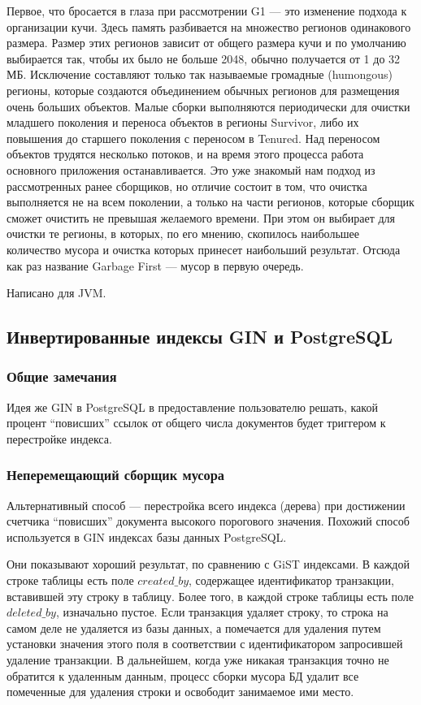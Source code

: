 Первое, что бросается в глаза при рассмотрении G1\cite{G1GC:2018} — это изменение подхода к организации кучи.
Здесь память разбивается на множество регионов одинакового размера. Размер этих регионов зависит
от общего размера кучи и по умолчанию выбирается так, чтобы их было не больше 2048,
обычно получается от 1 до 32 МБ. Исключение составляют только так называемые громадные (humongous)
регионы, которые создаются объединением обычных регионов для размещения очень больших объектов.
Малые сборки выполняются периодически для очистки младшего поколения и переноса объектов
в регионы Survivor, либо их повышения до старшего поколения с переносом в Tenured.
Над переносом объектов трудятся несколько потоков, и на время этого процесса работа основного
приложения останавливается. Это уже знакомый нам подход из рассмотренных ранее сборщиков,
но отличие состоит в том, что очистка выполняется не на всем поколении, а только на части регионов,
которые сборщик сможет очистить не превышая желаемого времени. При этом он выбирает для очистки те регионы,
в которых, по его мнению, скопилось наибольшее количество мусора и очистка которых принесет наибольший результат.
Отсюда как раз название Garbage First — мусор в первую очередь.

Написано для JVM.

\subsection{Инвертированные индексы GIN и PostgreSQL}

\subsubsection{Общие замечания}

Идея же GIN\cite{GIN:2020} в PostgreSQL в предоставление пользователю решать, какой процент “повисших” ссылок
от общего числа документов будет триггером к перестройке индекса. 

\subsubsection{Неперемещающий сборщик мусора}

Альтернативный способ — перестройка всего индекса (дерева) при достижении счетчика “повисших”
документа высокого порогового значения. Похожий способ используется в GIN индексах базы данных PostgreSQL.

Они показывают хороший результат, по сравнению с GiST индексами. В каждой строке таблицы есть поле
$created\_by$, содержащее идентификатор транзакции, вставившей эту строку в таблицу. Более того, в каждой
строке таблицы есть поле $deleted\_by$, изначально пустое. Если транзакция удаляет строку, то строка
на самом деле не удаляется из базы данных, а помечается для удаления путем установки значения этого поля
в соответствии с идентификатором запросившей удаление транзакции. В дальнейшем, когда уже никакая транзакция
точно не обратится к удаленным данным, процесс сборки мусора БД удалит все помеченные для удаления строки
и освободит занимаемое ими место.

